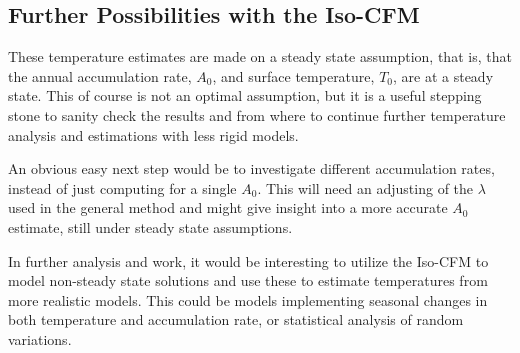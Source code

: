 \documentclass[../../CompleteThesis2/Complete_2ndDraft]{subfiles}
\begin{document}
\subsection[Iso-CFM Possibilities]{Further Possibilities with the Iso-CFM}
\label{Sec:Results_TempEstData_IsoCFMPossibilities}
These temperature estimates are made on a steady state assumption, that is, that the annual accumulation rate, $A_0$, and surface temperature, $T_0$, are at a steady state. This of course is not an optimal assumption, but it is a useful stepping stone to sanity check the results and from where to continue further temperature analysis and estimations with less rigid models.

An obvious easy next step would be to investigate different accumulation rates, instead of just computing for a single $A_0$. This will need an adjusting of the $\lambda$ used in the general method and might give insight into a more accurate $A_0$ estimate, still under steady state assumptions. 

In further analysis and work, it would be interesting to utilize the Iso-CFM to model non-steady state solutions and use these to estimate temperatures from more realistic models. This could be models implementing seasonal changes in both temperature and accumulation rate, or statistical analysis of random variations.
\end{document}
